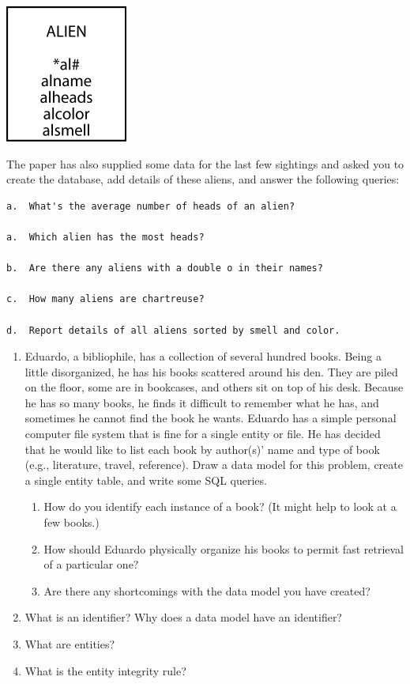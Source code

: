 \documentclass[
]{article}
\begin{document}
\includegraphics[width=1.58333in,height=\textheight]{Figures/Chapter 3/alien entity.png}

The paper has also supplied some data for the last few sightings and asked you to create the database, add details of these aliens, and answer the following queries:

\begin{verbatim}
a.  What's the average number of heads of an alien?

a.  Which alien has the most heads?

b.  Are there any aliens with a double o in their names?

c.  How many aliens are chartreuse?

d.  Report details of all aliens sorted by smell and color.
\end{verbatim}

\begin{enumerate}
\def\labelenumi{\arabic{enumi}.}
\setcounter{enumi}{4}
\item
  Eduardo, a bibliophile, has a collection of several hundred books. Being a little disorganized, he has his books scattered around his den. They are piled on the floor, some are in bookcases, and others sit on top of his desk. Because he has so many books, he finds it difficult to remember what he has, and sometimes he cannot find the book he wants. Eduardo has a simple personal computer file system that is fine for a single entity or file. He has decided that he would like to list each book by author(s)' name and type of book (e.g., literature, travel, reference). Draw a data model for this problem, create a single entity table, and write some SQL queries.

  \begin{enumerate}
  \def\labelenumii{\alph{enumii}.}
  \item
    How do you identify each instance of a book? (It might help to look at a few books.)
  \item
    How should Eduardo physically organize his books to permit fast retrieval of a particular one?
  \item
    Are there any shortcomings with the data model you have created?
  \end{enumerate}
\item
  What is an identifier? Why does a data model have an identifier?
\item
  What are entities?
\item
  What is the entity integrity rule?
\end{enumerate}
\end{document}
